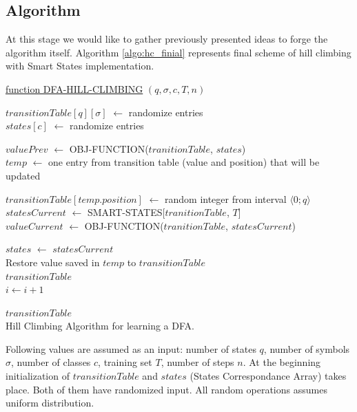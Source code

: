 \documentclass{mini}
\begin{document}
\subsection{Algorithm} \label{subsec:algo_hc__}
At this stage we would like to gather previously presented ideas to forge the algorithm itself. Algorithm \ref{algo:hc_finial} represents final scheme of hill climbing with Smart States implementation.

\begin{algorithm}[H]
    \underline{function DFA-HILL-CLIMBING} $(q, \sigma, c, T, n)$\;

    \bigskip
	$transitionTable[q][\sigma]$ $\gets$ randomize entries \\
	$states[c]$ $\gets$ randomize entries \\
    \bigskip

    {
    	$valuePrev$ $\gets$ OBJ-FUNCTION($tranitionTable$, $states$) \\
		$temp$ $\gets$ one entry from transition table (value and position) that will be updated \\
		\bigskip

		$transitionTable[temp.position]$ $\gets$  random integer from interval $\langle 0 ; q \rangle$\\
		$statesCurrent$	$\gets$  SMART-STATES[$tranitionTable$, $T$]\\
		$valueCurrent$ $\gets$ OBJ-FUNCTION($tranitionTable$, $statesCurrent$) \\
		\bigskip

    	{
			$states$ $\gets$ $statesCurrent$ \\
   		}
   		{
   			Restore value saved in $temp$ to $transitionTable$ \\
   		}
    	\bigskip
    	{
			\Return $transitionTable$ \\
   		}
   		$i \gets i + 1$
    }

    \bigskip
    \Return $transitionTable$ \\

    \caption{Hill Climbing Algorithm for learning a DFA.}
    \label{algo:hc_finial}
\end{algorithm}
\pagebreak
Following values are assumed as an input: number of states $q$, number of symbols $\sigma$, number of classes $c$, training set $T$, number of steps $n$. At the beginning initialization of $transitionTable$ and $states$ (States Correspondance Array) takes place. Both of them have randomized input. All random operations assumes uniform distribution.
\end{document}

